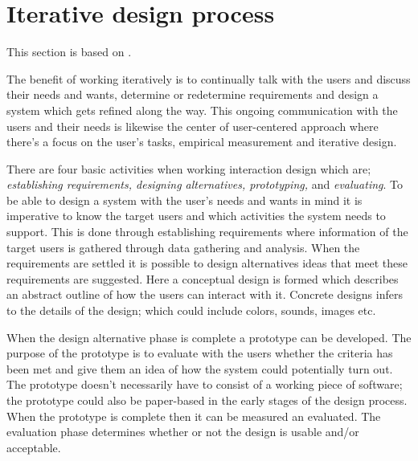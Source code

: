 \section{Iterative design process} \label{sec:iterativ}
This section is based on \cite{InteractionDesign,Rod-Aalborg,Iterative-Toolsqa}.


The benefit of working iteratively is to continually talk with the users and discuss their needs and wants, determine or redetermine requirements and design a system which gets refined along the way. This ongoing communication with the users and their needs is likewise the center of user-centered approach where there’s a focus on the user’s tasks, empirical measurement and iterative design.

There are four basic activities when working interaction design which are;
\textit{establishing requirements, designing alternatives, prototyping,} and \textit{evaluating}. To be able to design a system with the user’s needs and wants in mind it is imperative to know the target users and which activities the system needs to support. This is done through establishing requirements where information of the target users is gathered through data gathering and analysis. When the requirements are settled it is possible to design alternatives ideas that meet these requirements are suggested. Here a conceptual design is formed which describes an abstract outline of how the users can interact with it. Concrete designs infers to the details of the design; which could include colors, sounds, images etc. 

When the design alternative phase is complete a prototype can be developed. The purpose of the prototype is to evaluate with the users whether the criteria has been met and give them an idea of how the system could potentially turn out. The prototype doesn’t necessarily have to consist of a working piece of software; the prototype could also be paper-based in the early stages of the design process. When the prototype is complete then it can be measured an evaluated. The evaluation phase determines whether or not the design is usable and/or acceptable. 

